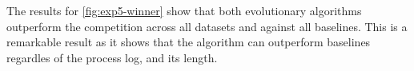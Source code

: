 \documentclass[./../../paper.tex]{subfiles}
\begin{document}
The results for \autoref{fig:exp5-winner} show that both evolutionary algorithms outperform the competition across all datasets and against all baselines. This is a remarkable result as it shows that the algorithm can outperform baselines regardles of the process log, and its length.
\end{document}
